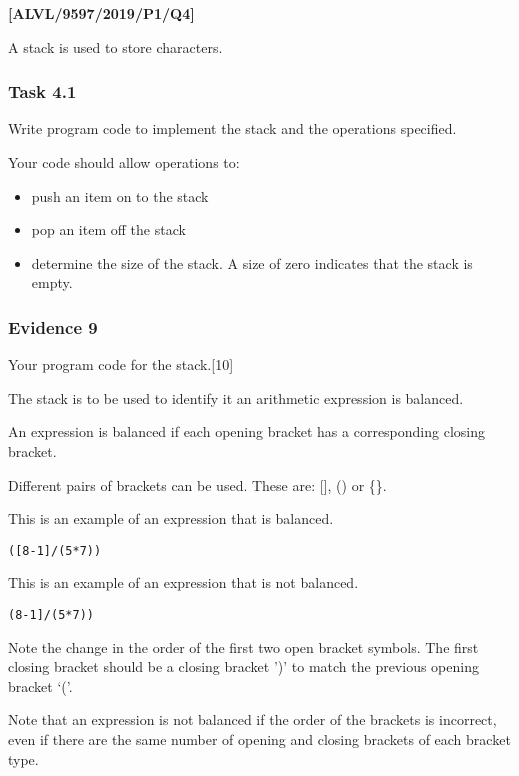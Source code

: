 \item \textbf{{[}ALVL/9597/2019/P1/Q4{]} }

A stack is used to store characters.

\subsubsection*{Task 4.1}

Write program code to implement the stack and the operations specified.

Your code should allow operations to: 
\begin{itemize}
\item push an item on to the stack
\item pop an item off the stack
\item determine the size of the stack. A size of zero indicates that the
stack is empty.
\end{itemize}

\subsubsection*{Evidence 9}

Your program code for the stack.\hfill{}{[}10{]}

The stack is to be used to identify it an arithmetic expression is
balanced. 

An expression is balanced if each opening bracket has a corresponding
closing bracket. 

Different pairs of brackets can be used. These are: {[}{]}, () or
\{\}. 

This is an example of an expression that is balanced.

\texttt{\qquad{}({[}8-1{]}/(5{*}7)) }

This is an example of an expression that is not balanced. 

\texttt{\qquad{}{[}(8-1{]}/(5{*}7)) }

Note the change in the order of the first two open bracket symbols.
The first closing bracket should be a closing bracket ')' to match
the previous opening bracket \textquoteleft ('. 

Note that an expression is not balanced if the order of the brackets
is incorrect, even if there are the same number of opening and closing
brackets of each bracket type. 

